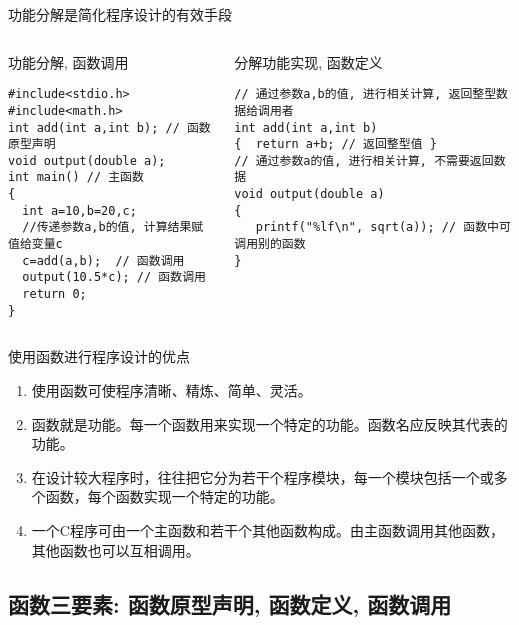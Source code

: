 \begin{frame}{功能分解是简化程序设计的有效手段}
\vspace{-0.3cm}
\begin{columns}[T]
\begin{beamerboxesrounded}{功能分解, 函数调用}
\begin{lstlisting}
#include<stdio.h>
#include<math.h>
int add(int a,int b); // 函数原型声明
void output(double a);
int main() // 主函数
{
  int a=10,b=20,c;
  //传递参数a,b的值, 计算结果赋值给变量c 
  c=add(a,b);  // 函数调用
  output(10.5*c); // 函数调用
  return 0; 
}
\end{lstlisting}
\end{beamerboxesrounded}
\begin{beamerboxesrounded}{分解功能实现, 函数定义}
\begin{lstlisting}
// 通过参数a,b的值, 进行相关计算, 返回整型数据给调用者
int add(int a,int b)
{  return a+b; // 返回整型值 }
// 通过参数a的值, 进行相关计算, 不需要返回数据
void output(double a)
{  
   printf("%lf\n", sqrt(a)); // 函数中可调用别的函数
}
\end{lstlisting}
\end{beamerboxesrounded}
\end{columns}
\end{frame}

\begin{frame}{使用函数进行程序设计的优点}
\begin{enumerate}
	\setlength{\itemsep}{.5cm}
	\item 使用函数可使程序清晰、精炼、简单、灵活。
	\item 函数就是功能。每一个函数用来实现一个特定的功能。函数名应反映其代表的功能。
	\item 在设计较大程序时，往往把它分为若干个程序模块，每一个模块包括一个或多个函数，每个函数实现一个特定的功能。
	\item 一个C程序可由一个主函数和若干个其他函数构成。由主函数调用其他函数，其他函数也可以互相调用。	
\end{enumerate}
\end{frame}

\subsection{函数三要素: 函数原型声明, 函数定义, 函数调用}

